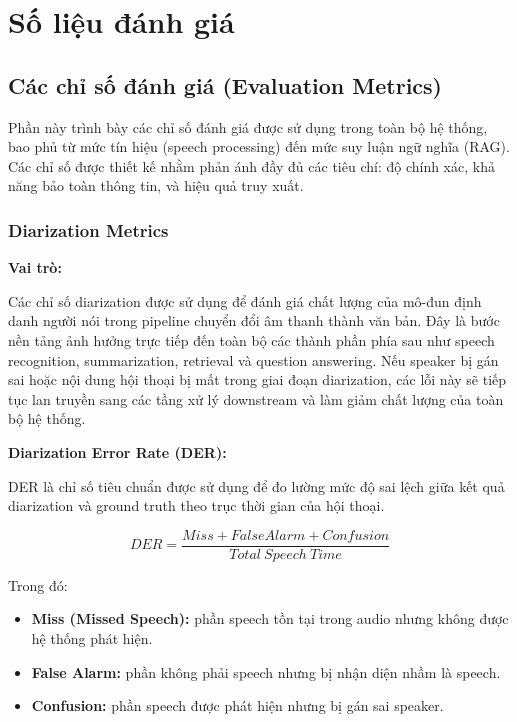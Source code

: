 \section{Số liệu đánh giá}
\subsection{Các chỉ số đánh giá (Evaluation Metrics)}

Phần này trình bày các chỉ số đánh giá được sử dụng trong toàn bộ hệ thống, bao phủ từ mức tín hiệu (speech processing) đến mức suy luận ngữ nghĩa (RAG). Các chỉ số được thiết kế nhằm phản ánh đầy đủ các tiêu chí: độ chính xác, khả năng bảo toàn thông tin, và hiệu quả truy xuất.

\subsubsection{Diarization Metrics}

\textbf{Vai trò:}

Các chỉ số diarization được sử dụng để đánh giá chất lượng của mô-đun định danh người nói trong pipeline chuyển đổi âm thanh thành văn bản. Đây là bước nền tảng ảnh hưởng trực tiếp đến toàn bộ các thành phần phía sau như speech recognition, summarization, retrieval và question answering. Nếu speaker bị gán sai hoặc nội dung hội thoại bị mất trong giai đoạn diarization, các lỗi này sẽ tiếp tục lan truyền sang các tầng xử lý downstream và làm giảm chất lượng của toàn bộ hệ thống.

\textbf{Diarization Error Rate (DER):}

DER là chỉ số tiêu chuẩn được sử dụng để đo lường mức độ sai lệch giữa kết quả diarization và ground truth theo trục thời gian của hội thoại.

\[
DER = \frac{Miss + FalseAlarm + Confusion}{Total\ Speech\ Time}
\]

Trong đó:
\begin{itemize}
    \item \textbf{Miss (Missed Speech):} phần speech tồn tại trong audio nhưng không được hệ thống phát hiện.
    
    \item \textbf{False Alarm:} phần không phải speech nhưng bị nhận diện nhầm là speech.
    
    \item \textbf{Confusion:} phần speech được phát hiện nhưng bị gán sai speaker.
\end{itemize}

